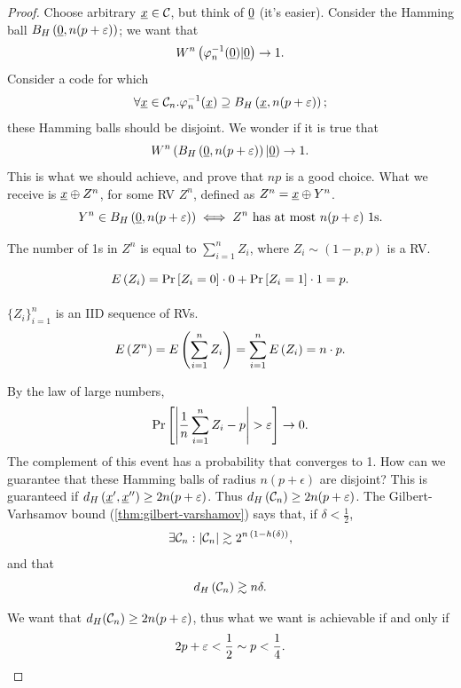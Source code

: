 \begin{proof}
	Choose arbitrary $\str{x} \in \C$, but think of $\zero$ (it's easier).
	Consider the Hamming ball $\hball{\zero}{n(p+\epsilon)}$; we want that
	\begin{equation*}
		W^n \left( \phi^{-1}_n(\zero) | \zero \right) \to 1.
	\end{equation*}
	Consider a code for which
	\begin{equation*}
		\forall \str{x} \in \C_n .
		\phi^{-1}_n(\str{x}) \supseteq \hball{\str{x}}{n(p+\epsilon)};
	\end{equation*}
	these Hamming balls should be disjoint.
	We wonder if it is true that
	\begin{equation*}
		W^n \left( \hball{\zero}{n(p+\epsilon)} | \zero \right) \to 1.
	\end{equation*}
	This is what we should achieve, and prove that $np$ is a good choice.
	What we receive is $\str{x} \xor Z^n$, for some \ac{RV} $Z^n$, defined as $Z^n = \str{x} \xor Y^n$.
	\begin{equation*}
		Y^n \in \hball{\zero}{n(p+\epsilon)} \iff Z^n \text{ has at most } n(p+\epsilon) \text{ 1s}. 
	\end{equation*}

	The number of 1s in $Z^n$ is equal to $\sum_{i = 1}^{n} Z_i$, where $Z_i \sim (1-p, p)$ is a \ac{RV}.

	\begin{equation*}
		\expectation{Z_i} = \Pr{Z_i = 0} \cdot 0 + \Pr{Z_i = 1} \cdot 1 = p.
	\end{equation*}

	$\{Z_i\}_{i=1}^n$ is an \ac{IID} sequence of \acp{RV}.
	\begin{equation*}
		\expectation{Z^n} =
		\expectation{\sum_{i = 1}^{n} Z_i} =
		\sum_{i = 1}^{n} \expectation{Z_i} =
		n \cdot p.
	\end{equation*}

	By the law of large numbers,
	\begin{equation*}
		\Pr{\abs{\frac{1}{n} \sum_{i = 1}^{n} Z_i - p} > \epsilon} \to 0.
	\end{equation*}
	The complement of this event has a probability that converges to 1.
	How can we guarantee that these Hamming balls of radius $n(p+\epsilon)$ are disjoint?
	This is guaranteed if $\hdist{\str{x}',\str{x}''} \ge 2n (p+\epsilon)$.
	Thus $\hdist{\C_n} \ge 2n(p+\epsilon)$.
	The Gilbert-Varhsamov bound (\cref{thm:gilbert-varshamov}) says that, if $\delta < \frac{1}{2}$,
	\begin{equation*}
		\exists \C_n : \abs{\C_n} \gtrsim 2^{n \, (1-\entropy{\delta})},
	\end{equation*}
	and that
	\begin{equation*}
		\hdist{\C_n} \gtrsim n \delta.
	\end{equation*}

	We want that $d_H(\C_n) \ge 2n(p+\epsilon)$, thus what we want is achievable if and only if
	\begin{equation*}
		2p + \epsilon < \dfrac{1}{2} \sim p < \dfrac{1}{4}. \qedhere
	\end{equation*}
\end{proof}

